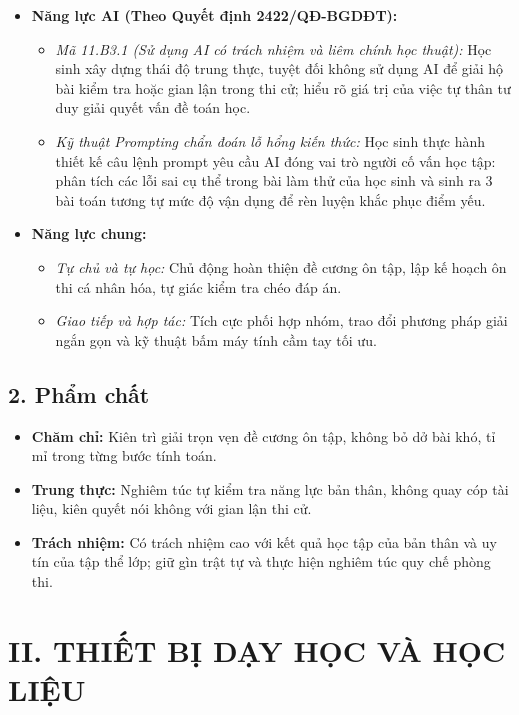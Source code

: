 \documentclass[12pt, a4paper]{article}
\begin{document}
\begin{itemize}[leftmargin=1.2cm]
    \item \textbf{Năng lực AI (Theo Quyết định 2422/QĐ-BGDĐT):}
    \begin{itemize}[leftmargin=0.6cm]
        \item \textit{Mã 11.B3.1 (Sử dụng AI có trách nhiệm và liêm chính học thuật):} Học sinh xây dựng thái độ trung thực, tuyệt đối không sử dụng AI để giải hộ bài kiểm tra hoặc gian lận trong thi cử; hiểu rõ giá trị của việc tự thân tư duy giải quyết vấn đề toán học.
        \item \textit{Kỹ thuật Prompting chẩn đoán lỗ hổng kiến thức:} Học sinh thực hành thiết kế câu lệnh prompt yêu cầu AI đóng vai trò người cố vấn học tập: phân tích các lỗi sai cụ thể trong bài làm thử của học sinh và sinh ra 3 bài toán tương tự mức độ vận dụng để rèn luyện khắc phục điểm yếu.
    \end{itemize}

    \item \textbf{Năng lực chung:}
    \begin{itemize}[leftmargin=0.6cm]
        \item \textit{Tự chủ và tự học:} Chủ động hoàn thiện đề cương ôn tập, lập kế hoạch ôn thi cá nhân hóa, tự giác kiểm tra chéo đáp án.
        \item \textit{Giao tiếp và hợp tác:} Tích cực phối hợp nhóm, trao đổi phương pháp giải ngắn gọn và kỹ thuật bấm máy tính cầm tay tối ưu.
    \end{itemize}
\end{itemize}

\subsection*{2. Phẩm chất}

\begin{itemize}[leftmargin=1.2cm]
    \item \textbf{Chăm chỉ:} Kiên trì giải trọn vẹn đề cương ôn tập, không bỏ dở bài khó, tỉ mỉ trong từng bước tính toán.
    \item \textbf{Trung thực:} Nghiêm túc tự kiểm tra năng lực bản thân, không quay cóp tài liệu, kiên quyết nói không với gian lận thi cử.
    \item \textbf{Trách nhiệm:} Có trách nhiệm cao với kết quả học tập của bản thân và uy tín của tập thể lớp; giữ gìn trật tự và thực hiện nghiêm túc quy chế phòng thi.
\end{itemize}

\section*{II. THIẾT BỊ DẠY HỌC VÀ HỌC LIỆU}
\end{document}
